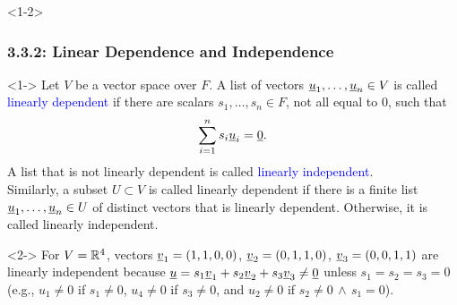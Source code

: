 \documentclass[10pt,english,aspectratio=169]{beamer}
\begin{document}
\begin{frame}<1-2> \frametitle{3.3.2: Linear Dependence and Independence}

\begin{definition}<1->
Let $V$ be a vector space over $F$.
A list of vectors $\underline{u}_1, \ldots, \underline{u}_n \in V $ is called \textcolor{blue}{linearly dependent} if there are scalars $s_1, \ldots, s_n \in F$, not all equal to $0$, such that
\begin{equation*}
\sum_{i=1}^n s_i \underline{u}_i = \underline{0}.
\end{equation*}
A list that is not linearly dependent is called \textcolor{blue}{linearly independent}. \\[1.5mm]
Similarly, a subset $U \subset V$ is called linearly dependent if there is a finite list $\underline{u}_1, \ldots, \underline{u}_n \in U$ of distinct vectors that is linearly dependent.
Otherwise, it is called linearly independent.
\end{definition}

\begin{example}<2->
For $V=\mathbb{R}^4$, vectors $\underline{v}_1=(1,1,0,0)$, $\underline{v}_2=(0,1,1,0)$, $\underline{v}_3=(0,0,1,1)$ are linearly independent because $\underline{u} = s_1 \underline{v}_1 + s_2  \underline{v}_2 + s_3  \underline{v}_3 \neq \underline{0}$ unless $s_1 \!=\! s_2 \!=\! s_3 \!=\! 0$ (e.g., $u_1 \neq 0$ if $s_1 \neq 0$, $u_4 \neq 0$ if $s_3 \neq 0$, and $u_2 \neq 0$ if $s_2 \neq 0 \, \wedge \, s_1 = 0$).
\end{example}


\end{frame}
\end{document}
